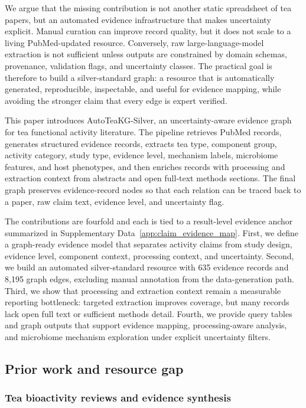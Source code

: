 \documentclass[11pt]{article}
\begin{document}
We argue that the missing contribution is not another static spreadsheet of tea papers, but an automated evidence infrastructure that makes uncertainty explicit. Manual curation can improve record quality, but it does not scale to a living PubMed-updated resource. Conversely, raw large-language-model extraction is not sufficient unless outputs are constrained by domain schemas, provenance, validation flags, and uncertainty classes. The practical goal is therefore to build a silver-standard graph: a resource that is automatically generated, reproducible, inspectable, and useful for evidence mapping, while avoiding the stronger claim that every edge is expert verified.

This paper introduces AutoTeaKG-Silver, an uncertainty-aware evidence graph for tea functional activity literature. The pipeline retrieves PubMed records, generates structured evidence records, extracts tea type, component group, activity category, study type, evidence level, mechanism labels, microbiome features, and host phenotypes, and then enriches records with processing and extraction context from abstracts and open full-text methods sections. The final graph preserves evidence-record nodes so that each relation can be traced back to a paper, raw claim text, evidence level, and uncertainty flag.

The contributions are fourfold and each is tied to a result-level evidence anchor summarized in Supplementary Data~\ref{app:claim_evidence_map}. First, we define a graph-ready evidence model that separates activity claims from study design, evidence level, component context, processing context, and uncertainty. Second, we build an automated silver-standard resource with 635 evidence records and 8,195 graph edges, excluding manual annotation from the data-generation path. Third, we show that processing and extraction context remain a measurable reporting bottleneck: targeted extraction improves coverage, but many records lack open full text or sufficient methods detail. Fourth, we provide query tables and graph outputs that support evidence mapping, processing-aware analysis, and microbiome mechanism exploration under explicit uncertainty filters.


\subsection{Prior work and resource gap}

\subsubsection{Tea bioactivity reviews and evidence synthesis}
\end{document}
